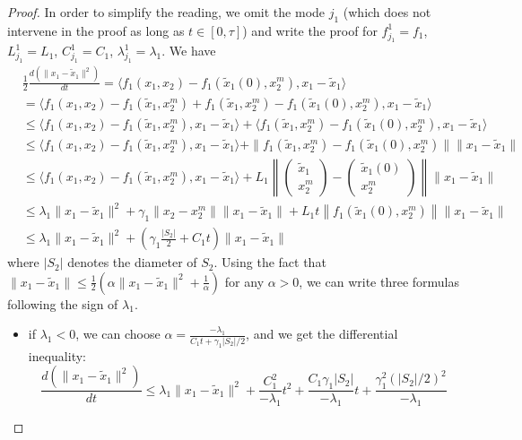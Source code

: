 \begin{proof}

In order to simplify the reading, we omit the mode $j_1$ (which does not
intervene in the proof as long as $t \in [0,\tau]$) and write the proof
for $f_{j_1}^1 = f_1$, $L_{j_1}^1 = L_1$, $C_{j_1}^1 = C_1$,
$\lambda^1_{j_1} = \lambda_1$.  We have
\begin{align*}
  &\frac{1}{2} \frac{d (\| x_1 - \tilde x_1 \|^2)}{dt}
   = \langle
  f_1(x_1,x_2) - f_1(\tilde x_1(0),x_2^m),x_1 - \tilde x_1 \rangle
\\
  & = \langle f_1(x_1,x_2) - f_1(\tilde x_1,x_2^m) + f_1(\tilde
  x_1,x_2^m) - f_1(\tilde x_1(0),x_2^m),x_1 - \tilde x_1 \rangle
\\
& \leq \langle f_1(x_1,x_2) - f_1(\tilde x_1,x_2^m), x_1 - \tilde
  x_1 \rangle + \langle f_1(\tilde x_1,x_2^m) - f_1(\tilde
  x_1(0),x_2^m),x_1 - \tilde x_1 \rangle
  \\
& \leq \langle f_1(x_1,x_2) - f_1(\tilde x_1,x_2^m), x_1 - \tilde
  x_1 \rangle + \| f_1(\tilde x_1,x_2^m) - f_1(\tilde x_1(0),x_2^m) \|
  \|x_1 - \tilde x_1 \|
  \\
  & \leq \langle f_1(x_1,x_2) - f_1(\tilde x_1,x_2^m), x_1 - \tilde x_1 \rangle + L_1 \left\| \begin{pmatrix}
      \tilde x_1 \\ x_2^m \end{pmatrix} - \begin{pmatrix} \tilde x_1(0)
      \\ x_2^m \end{pmatrix} \right\| \|x_1 - \tilde x_1 \|
  \\
  & \leq \lambda_1  \| x_1 - \tilde x_1 \|^2 + \gamma_1  \| x_2 - x_2^m \| \| x_1 - \tilde x_1 \| + L_1 t \left\| f_1(\tilde x_1(0),x_2^m)
\right\| \|x_1 - \tilde x_1 \|
\\
& \leq \lambda_1 \| x_1 - \tilde x_1 \|^2 + \left( \gamma_1
  \frac{|S_2|}{2} + C_1 t \right) \|x_1 - \tilde x_1 \|
\end{align*}
where $|S_2|$ denotes the diameter of $S_2$.  Using the fact that
$\|x_1 - \tilde x_1 \| \leq \frac{1}{2} (\alpha \|x_1 - \tilde x_1
\|^2 + \frac{1}{\alpha}) $ for any $\alpha >0$, we can write three
formulas following the sign of $\lambda_1$.
\begin{itemize}
\item if $\lambda_1 <0$, we can choose $\alpha = \frac{-
    \lambda_1}{C_1 t + \gamma_1 |S_2|/2}$, and we get the differential
  inequality:
$$\frac{d (\| x_1 - \tilde x_1 \|^2)}{dt}  \leq \lambda_1 \|x_1 - \tilde x_1 \|^2  + \frac{C_1^2}{-\lambda_1} t^2 + \frac{C_1 \gamma_1 |S_2|}{-\lambda_1}t  + \frac{\gamma_1 ^2 (|S_2|/2)^2}{-\lambda_1}$$

\end{itemize}
\end{proof}
